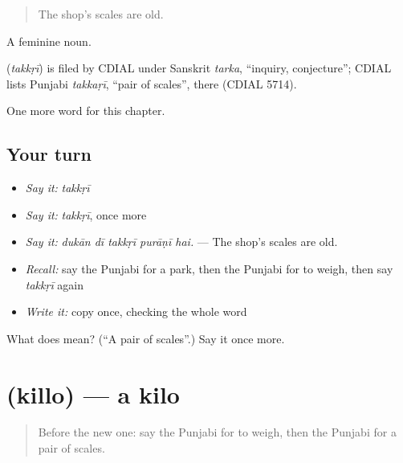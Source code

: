 \begin{quote}
The shop's scales are old.
\end{quote}

A feminine noun.

\begin{cousinweb}
\textbf{} (\emph{takkṛī}) is filed by CDIAL under Sanskrit \emph{tarka}, \textquotedblleft{}inquiry, conjecture\textquotedblright{}; CDIAL lists Punjabi \emph{takkaṛī}, \textquotedblleft{}pair of scales\textquotedblright{}, there (CDIAL 5714).
\end{cousinweb}

\begin{grammarlens}[title={What you've built}]
One more word for this chapter.
\end{grammarlens}

\subsection*{Your turn}
\begin{itemize}
\raggedright
  \item \emph{Say it:} \emph{takkṛī}
  \item \emph{Say it:} \emph{takkṛī}, once more
  \item \emph{Say it:} \emph{dukān dī takkṛī purāṇī hai.} — The shop's scales are old.
  \item \emph{Recall:} say the Punjabi for a park, then the Punjabi for to weigh, then say \emph{takkṛī} again
  \item \emph{Write it:} copy \textbf{} once, checking the whole word
\end{itemize}

\begin{tcolorbox}[breakable,colback=teal!4,colframe=teal!35!black,title={Before you move on}]
What does  mean? (\textquotedblleft{}A pair of scales\textquotedblright{}.) Say it once more.
\end{tcolorbox}
\section[\texorpdfstring{\pa{ਕਿੱਲੋ} (killo)}{ਕਿੱਲੋ (killo)}]{ (killo) — a kilo}

\label{lesson:PA-C273-killo}



\begin{quote}
Before the new one: say the Punjabi for to weigh, then the Punjabi for a pair of scales.
\end{quote}

